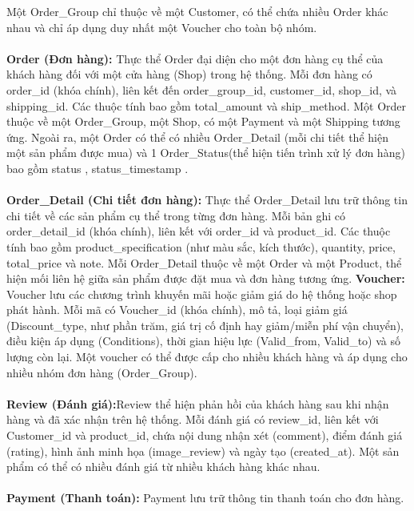 Một Order\_Group chỉ thuộc về một Customer, có thể chứa nhiều Order khác nhau và chỉ áp dụng duy nhất một Voucher 
cho toàn bộ nhóm.  \\ \\ 
\hspace*{2em} \textbf{Order (Đơn hàng):} Thực thể Order đại diện cho một đơn hàng cụ thể của khách hàng đối với một cửa hàng (Shop) 
trong hệ thống. Mỗi đơn hàng có order\_id (khóa chính), liên kết đến order\_group\_id, customer\_id, shop\_id, 
và shipping\_id. Các thuộc tính bao gồm total\_amount và ship\_method.
Một Order thuộc về một Order\_Group, một Shop, có một Payment và một Shipping tương ứng. 
Ngoài ra, một Order có thể có nhiều Order\_Detail (mỗi chi tiết thể hiện một sản phẩm được mua) và 
1 Order\_Status(thể hiện tiến trình xử lý đơn hàng) bao gồm status , status\_timestamp .   \\ \\
\hspace*{2em} \textbf{Order\_Detail (Chi tiết đơn hàng):}
Thực thể Order\_Detail lưu trữ thông tin chi tiết về các sản phẩm cụ thể trong từng đơn hàng. Mỗi bản ghi có order\_detail\_id (khóa chính), liên kết với order\_id và product\_id. Các thuộc tính bao gồm product\_specification (như màu sắc, kích thước), quantity, price, total\_price và note.
Mỗi Order\_Detail thuộc về một Order và một Product, thể hiện mối liên hệ giữa sản phẩm được đặt mua và đơn hàng tương ứng.
\hspace*{2em} \textbf{Voucher:} Voucher lưu các chương trình khuyến mãi hoặc giảm giá do hệ thống hoặc shop phát hành. 
Mỗi mã có Voucher\_id (khóa chính), mô tả, loại giảm giá (Discount\_type, như phần trăm, giá trị cố định hay giảm/miễn phí vận chuyển), 
điều kiện áp dụng (Conditions), thời gian hiệu lực (Valid\_from, Valid\_to) và số lượng còn lại. 
Một voucher có thể được cấp cho nhiều khách hàng và áp dụng cho nhiều nhóm đơn hàng (Order\_Group). \\ \\
\hspace*{2em} \textbf{Review (Đánh giá):}Review thể hiện phản hồi của khách hàng sau khi nhận hàng và đã xác nhận trên hệ thống. 
Mỗi đánh giá có review\_id, liên kết với Customer\_id và product\_id, chứa nội dung nhận xét (comment), 
điểm đánh giá (rating), hình ảnh minh họa (image\_review) và ngày tạo (created\_at). 
Một sản phẩm có thể có nhiều đánh giá từ nhiều khách hàng khác nhau. \\ \\ 
\hspace*{2em} \textbf{Payment (Thanh toán):} Payment lưu trữ thông tin thanh toán cho đơn hàng. 
